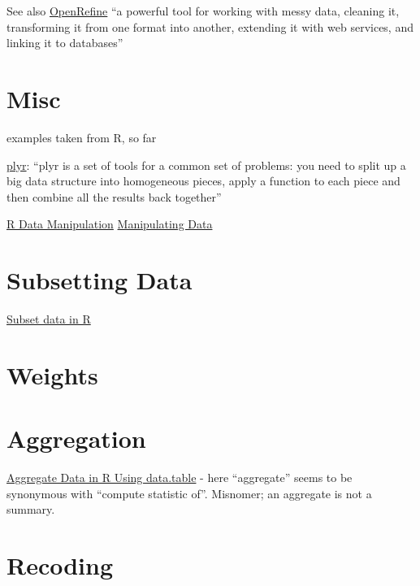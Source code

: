\documentclass[reqno,12pt]{tufte-book}
\numberwithin{equation}{subsection}
\begin{document}
See also \href{http://openrefine.org/}{OpenRefine} ``a powerful tool for working with messy data, cleaning it, transforming it from one format into another, extending it with web services, and linking it to databases''

\section{Misc}

\begin{remark}
  examples taken from R, so far
\end{remark}

\href{http://plyr.had.co.nz/}{plyr}: ``plyr is a set of tools for a
common set of problems: you need to split up a big data structure into
homogeneous pieces, apply a function to each piece and then combine
all the results back together''


\href{http://rprogramming.net/r-data-manipulation/}{R Data Manipulation}
\href{http://www.cookbook-r.com/Manipulating\_data/}{Manipulating Data}

\section{Subsetting Data}
\label{sect:datasubsetting}

\href{http://rprogramming.net/subset-data-in-r/}{Subset data in R}

\section{Weights}
\label{sect:dataweighting}

\section{Aggregation}
\label{sect:dataaggregate}

\href{http://rprogramming.net/aggregate-data-in-r-using-data-table/}{Aggregate
  Data in R Using data.table} - here ``aggregate'' seems to be
synonymous with ``compute statistic of''.  Misnomer; an aggregate is not a summary.

\section{Recoding}
\label{sect:recodingr}
\end{document}
